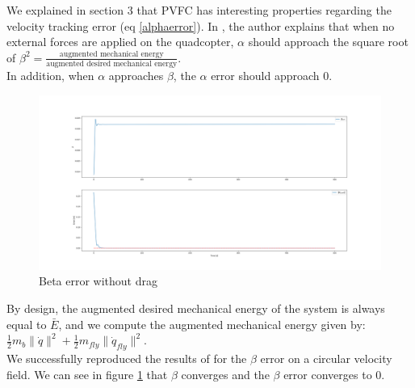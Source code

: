 We explained in section 3 that PVFC has interesting properties regarding the velocity tracking error (eq \ref{alphaerror}). 
In \cite{li1999passive}, the author explains that when no external forces are applied on the quadcopter, $\alpha$ should approach the square root of $\beta^2 = \frac{\text{augmented mechanical energy}}{\text{augmented desired mechanical energy}}$.\\
In addition, when $\alpha$ approaches $\beta$, the $\alpha$ error should approach 0.

\begin{figure}[h!]
   \centering
   \includegraphics[width=\linewidth, scale=1.5]{Images/betaerrornodrag.png}
   \caption{Beta error without drag}
   \label{fig:betaerrornodrag}
\end{figure}
By design, the augmented desired mechanical energy of the system is always equal to $\bar{E}$, and we compute the augmented mechanical energy given by:\\
$\frac{1}{2}m_b\lVert\dot{q}\rVert^2 + \frac{1}{2}m_{fly}\lVert\dot{q}_{fly}\rVert^2 $. \\
We successfully reproduced the results of \cite{li1999passive} for the $\beta$ error on a circular velocity field. We can see in figure \ref{fig:betaerrornodrag} that $\beta$ converges and the $\beta$ error converges to 0.

